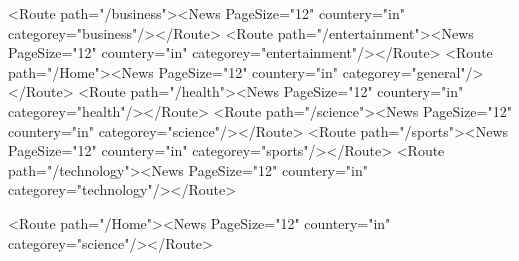 <Route path="/business"><News PageSize="12" countery="in" categorey="business"/></Route>
<Route path="/entertainment"><News PageSize="12" countery="in" categorey="entertainment"/></Route>
<Route path="/Home"><News PageSize="12" countery="in" categorey="general"/></Route>
<Route path="/health"><News PageSize="12" countery="in" categorey="health"/></Route>
<Route path="/science"><News PageSize="12" countery="in" categorey="science"/></Route>
<Route path="/sports"><News PageSize="12" countery="in" categorey="sports"/></Route>
<Route path="/technology"><News PageSize="12" countery="in" categorey="technology"/></Route>

<Route path="/Home"><News PageSize="12" countery="in" categorey="science"/></Route>